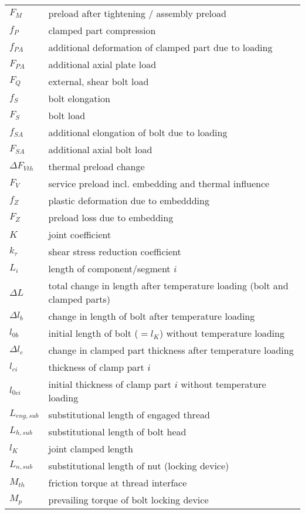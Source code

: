 \begin{longtable}{p{2cm} l}
  $F_M$ & preload after tightening / assembly preload \\
  $f_P$ & clamped part compression \\
  $f_{PA}$ & additional deformation of clamped part due to loading \\
  $F_{PA}$ & additional axial plate load \\
  $F_Q$ & external, shear bolt load \\
  $f_S$ & bolt elongation \\
  $F_S$ & bolt load \\
  $f_{SA}$ & additional elongation of bolt due to loading \\
  $F_{SA}$ & additional axial bolt load \\
  $\Delta F_{Vth}$ & thermal preload change \\
  $F_V$ & service preload incl. embedding and thermal influence \\
  $f_Z$ & plastic deformation due to embeddding \\
  $F_Z$ & preload loss due to embedding \\
  $K$ & joint coefficient \\
  $k_{\tau}$ & shear stress reduction coefficient \\
  $L_i$ & length of component/segment $i$ \\
  $\Delta L$ & total change in length after temperature loading (bolt and clamped parts) \\
  $\Delta l_b$ & change in length of bolt after temperature loading \\
  $l_{0b}$ & initial length of bolt ($=l_K$) without temperature loading \\
  $\Delta l_c$ & change in clamped part thickness after temperature loading \\
  $l_{ci}$ & thickness of clamp part $i$ \\
  $l_{0ci}$ & initial thickness of clamp part $i$ without temperature loading \\
  $L_{eng,sub}$ & substitutional length of engaged thread \\
  $L_{h,sub}$ & substitutional length of bolt head \\
  $l_K$ & joint clamped length \\
  $L_{n,sub}$ & substitutional length of nut (locking device) \\
  $M_{th}$ & friction torque at thread interface \\
  $M_p$ & prevailing torque of bolt locking device \\

\end{longtable}
